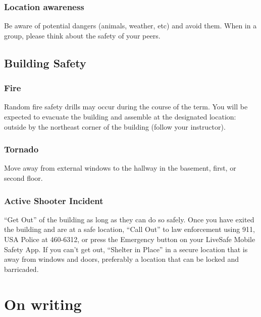 \documentclass[11pt,]{article}
\begin{document}
\hypertarget{location-awareness}{%
\subsubsection{Location awareness}\label{location-awareness}}

Be aware of potential dangers (animals, weather, etc) and avoid them.
When in a group, please think about the safety of your peers.

\hypertarget{building-safety}{%
\subsection{Building Safety}\label{building-safety}}

\hypertarget{fire}{%
\subsubsection{Fire}\label{fire}}

Random fire safety drills may occur during the course of the term. You
will be expected to evacuate the building and assemble at the designated
location: outside by the northeast corner of the building (follow your
instructor).

\hypertarget{tornado}{%
\subsubsection{Tornado}\label{tornado}}

Move away from external windows to the hallway in the basement, first,
or second floor.

\hypertarget{active-shooter-incident}{%
\subsubsection{Active Shooter Incident}\label{active-shooter-incident}}

``Get Out'' of the building as long as they can do so safely. Once you
have exited the building and are at a safe location, ``Call Out'' to law
enforcement using 911, USA Police at 460-6312, or press the Emergency
button on your LiveSafe Mobile Safety App. If you can't get out,
``Shelter in Place'' in a secure location that is away from windows and
doors, preferably a location that can be locked and barricaded.

\newpage

\hypertarget{on-writing}{%
\section{On writing}\label{on-writing}}
\end{document}
